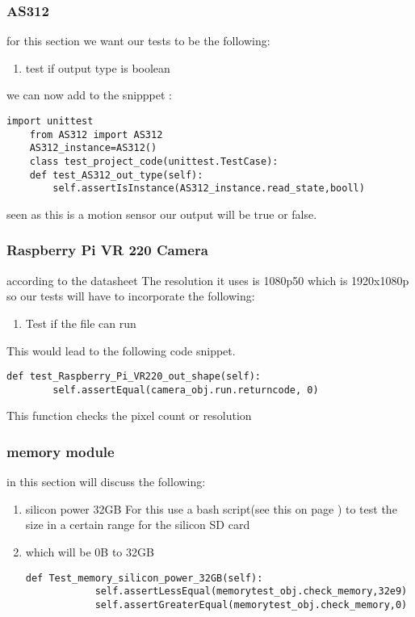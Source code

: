 \subsubsection{AS312}
for  this section  we  want our  tests  to  be  the following:
\begin{enumerate}
    \item test if output type is boolean 
\end{enumerate}
we can  now add to the snipppet :
\begin{lstlisting}[style=mystyle,caption={unit test for AS312}]
    import unittest
    from AS312 import AS312
    AS312_instance=AS312()
    class test_project_code(unittest.TestCase):
    def test_AS312_out_type(self):
        self.assertIsInstance(AS312_instance.read_state,booll)
\end{lstlisting}
seen as this is a motion sensor our output will be true or false.

\subsubsection{Raspberry Pi VR 220 Camera}
according to the  datasheet \cite{Camera} The  resolution it uses is  1080p50 which is 1920x1080p so our  tests will have to incorporate the  following:
\begin{enumerate}
    \item Test  if the file can run
\end{enumerate}
This would lead to the following code snippet.
\begin{lstlisting}[style=mystyle,caption={camera unit test}]
    def test_Raspberry_Pi_VR220_out_shape(self):
        self.assertEqual(camera_obj.run.returncode, 0)
\end{lstlisting}
This function checks the pixel count or resolution

\subsubsection{memory module}
in this section will discuss the following:
\begin{enumerate}
    \item silicon power 32GB 
For this use a  bash script(see this on page \pageref{TDD sample bash}) to test the size in a  certain range for the silicon  SD card
    \item which will be 0B to 32GB
    
    \begin{lstlisting}[style=mystyle]
        def Test_memory_silicon_power_32GB(self):
            self.assertLessEqual(memorytest_obj.check_memory,32e9)
            self.assertGreaterEqual(memorytest_obj.check_memory,0)
    \end{lstlisting}
\end{enumerate} 
